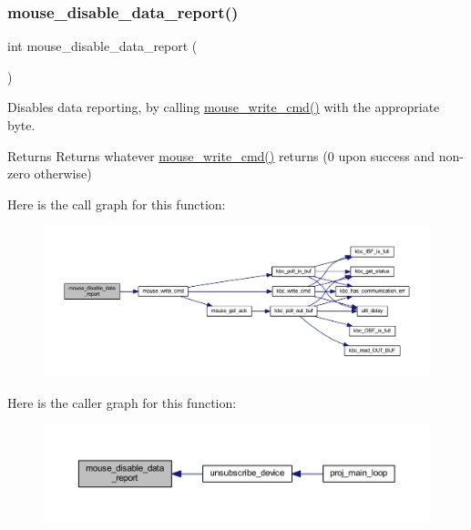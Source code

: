 \subsubsection{\texorpdfstring{mouse\+\_\+disable\+\_\+data\+\_\+report()}{mouse\_disable\_data\_report()}}
{\footnotesize\ttfamily int mouse\+\_\+disable\+\_\+data\+\_\+report (\begin{DoxyParamCaption}{ }\end{DoxyParamCaption})}



Disables data reporting, by calling \mbox{\hyperlink{group__mouse_ga14261d6dca45cb7cc9c8a786739ac5a3}{mouse\+\_\+write\+\_\+cmd()}} with the appropriate byte. 

\begin{DoxyReturn}{Returns}
Returns whatever \mbox{\hyperlink{group__mouse_ga14261d6dca45cb7cc9c8a786739ac5a3}{mouse\+\_\+write\+\_\+cmd()}} returns (0 upon success and non-\/zero otherwise) 
\end{DoxyReturn}
Here is the call graph for this function\+:\nopagebreak
\begin{figure}[H]
\begin{center}
\leavevmode
\includegraphics[width=350pt]{group__mouse_gac13ad81d843b4d50815de4b20a28db53_cgraph}
\end{center}
\end{figure}
Here is the caller graph for this function\+:\nopagebreak
\begin{figure}[H]
\begin{center}
\leavevmode
\includegraphics[width=350pt]{group__mouse_gac13ad81d843b4d50815de4b20a28db53_icgraph}
\end{center}
\end{figure}
\mbox{\label{group__mouse_ga9b5d5366f7067f50586c03e9a3f000cd}} 
